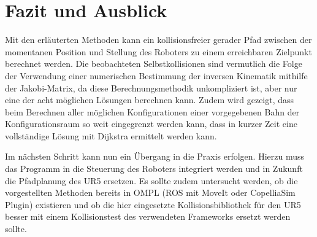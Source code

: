 \cleardoublepage
\chapter{Fazit und Ausblick}

Mit den erläuterten Methoden kann ein kollisionsfreier gerader Pfad zwischen der momentanen Position und Stellung des Roboters zu einem erreichbaren Zielpunkt berechnet werden.
Die beobachteten Selbstkollisionen sind vermutlich die Folge der Verwendung einer numerischen Bestimmung der inversen Kinematik mithilfe der Jakobi-Matrix, da diese Berechnungsmethodik unkompliziert ist, aber nur eine der acht möglichen Lösungen berechnen kann.
Zudem wird gezeigt, dass beim Berechnen aller möglichen Konfigurationen einer vorgegebenen Bahn der Konfigurationsraum so weit eingegrenzt werden kann, dass in kurzer Zeit eine vollständige Lösung mit Dijkstra ermittelt werden kann.

Im nächsten Schritt kann nun ein Übergang in die Praxis erfolgen.
Hierzu muss das Programm in die Steuerung des Roboters integriert werden und in Zukunft die Pfadplanung des UR5 ersetzen.
Es sollte zudem untersucht werden, ob die vorgestellten Methoden bereits in OMPL (ROS mit MoveIt oder CopelliaSim Plugin) existieren und ob die hier eingesetzte Kollisionsbibliothek für den UR5 besser mit einem Kollisionstest des verwendeten Frameworks ersetzt werden sollte.